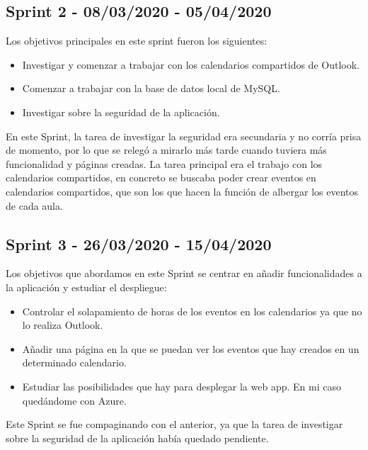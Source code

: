 \subsection{Sprint 2 - 08/03/2020 - 05/04/2020}
Los objetivos principales en este sprint fueron los siguientes:
\begin{itemize}
    \item Investigar y comenzar a trabajar con los calendarios compartidos de Outlook.
    \item Comenzar a trabajar con la base de datos local de MySQL.
    \item Investigar sobre la seguridad de la aplicación.
\end{itemize}
En este Sprint, la tarea de investigar la seguridad era secundaria y no corría prisa de momento, por lo que se relegó a mirarlo más tarde cuando tuviera más funcionalidad y páginas creadas. La tarea principal era el trabajo con los calendarios compartidos, en concreto se buscaba poder crear eventos en calendarios compartidos, que son los que hacen la función de albergar los eventos de cada aula.

\subsection{Sprint 3 - 26/03/2020 - 15/04/2020}
Los objetivos que abordamos en este Sprint se centrar en añadir funcionalidades a la aplicación y estudiar el despliegue:
\begin{itemize}
    \item Controlar el solapamiento de horas de los eventos en los calendarios ya que no lo realiza Outlook.
    \item Añadir una página en la que se puedan ver los eventos que hay creados en un determinado calendario.
    \item Estudiar las posibilidades que hay para desplegar la web app. En mi caso quedándome con Azure.
\end{itemize}
Este Sprint se fue compaginando con el anterior, ya que la tarea de investigar sobre la seguridad de la aplicación había quedado pendiente.
